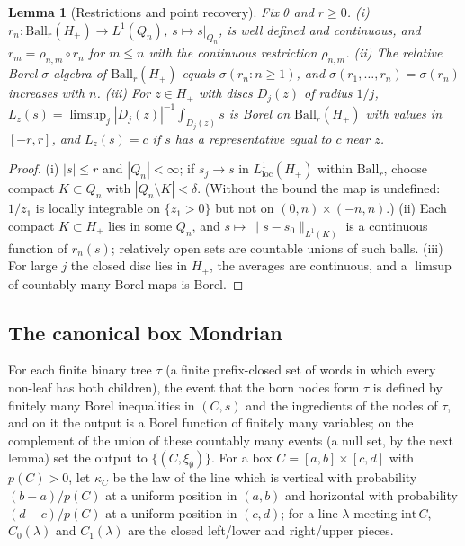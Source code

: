\documentclass[11pt]{article}
\theoremstyle{plain}
\newtheorem{lemma}[theorem]{Lemma}
\theoremstyle{definition}
\theoremstyle{remark}
\newcommand{\Ball}{\mathrm{Ball}}
\begin{document}
\begin{lemma}[Restrictions and point recovery]\label{lem:E-restrictions}
Fix $\theta$ and $r\ge0$. (i) $r_n:\Ball_r(H_+)\to L^{1}(Q_n)$, $s\mapsto s|_{Q_n}$, is well defined
and continuous, and $r_m=\rho_{n,m}\circ r_n$ for $m\le n$ with the continuous restriction
$\rho_{n,m}$. (ii) The relative Borel $\sigma$-algebra of $\Ball_r(H_+)$ equals $\sigma(r_n:n\ge1)$,
and $\sigma(r_1,\dots,r_n)=\sigma(r_n)$ increases with $n$. (iii) For $z\in H_+$ with discs
$D_j(z)$ of radius $1/j$, $L_z(s)=\limsup_j|D_j(z)|^{-1}\int_{D_j(z)}s$ is Borel on $\Ball_r(H_+)$ with values
in $[-r,r]$, and $L_z(s)=c$ if $s$ has a representative equal to $c$ near $z$.
\end{lemma}

\begin{proof}
(i) $|s|\le r$ and $|Q_n|<\infty$; if $s_j\to s$ in $L^{1}_{\mathrm{loc}}(H_+)$ within $\Ball_r$, choose compact
$K\subset Q_n$ with $|Q_n\setminus K|<\delta$. (Without the bound the map is undefined:
$1/z_1$ is locally integrable on $\{z_1>0\}$ but not on $(0,n)\times(-n,n)$.) (ii) Each
compact $K\subset H_+$ lies in some $Q_n$, and $s\mapsto\|s-s_0\|_{L^{1}(K)}$ is a continuous
function of $r_n(s)$; relatively open sets are countable unions of such balls.
(iii) For large $j$ the closed disc lies in $H_+$, the averages are continuous, and a
$\limsup$ of countably many Borel maps is Borel.
\end{proof}

\subsection{The canonical box Mondrian}

For each finite binary tree $\tau$ (a finite prefix-closed set of words in which every
non-leaf has both children), the event that the born nodes form $\tau$ is defined by
finitely many Borel inequalities in $(C,s)$ and the ingredients of the nodes of $\tau$,
and on it the output is a Borel function of finitely many variables; on the
complement of the union of these countably many events (a null set, by the next
lemma) set the output to $\{(C,\xi_\emptyset)\}$. For a box $C=[a,b]\times[c,d]$ with $p(C)>0$, let
$\kappa_C$ be the law of the line which is vertical with probability $(b-a)/p(C)$ at a
uniform position in $(a,b)$ and horizontal with probability $(d-c)/p(C)$ at a uniform
position in $(c,d)$; for a line $\lambda$ meeting $\mathrm{int}\,C$, $C_0(\lambda)$ and $C_1(\lambda)$ are the
closed left/lower and right/upper pieces.
\end{document}
